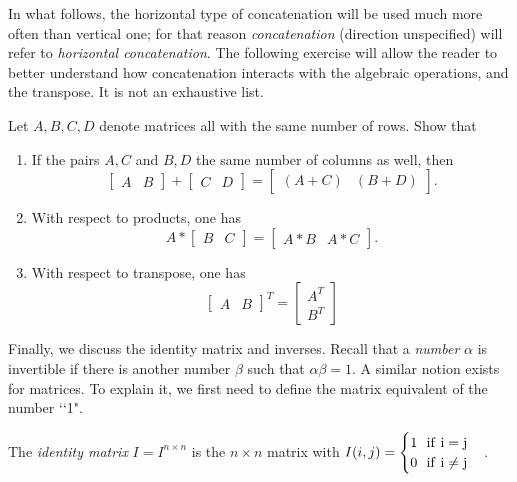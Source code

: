 \documentclass{ximera}
\begin{document}
In what follows, the horizontal type of concatenation will be used much more often than vertical one; for that reason {\it concatenation} (direction unspecified) will refer to {\it horizontal concatenation}. The following exercise will allow the reader to better understand how concatenation interacts with the algebraic operations, and the transpose. It is not an exhaustive list.

\begin{exercise} Let $A, B, C, D$ denote matrices all with the same number of rows. Show that
\begin{enumerate}
\item If the pairs $A,C$ and $B,D$ the same number of columns as well, then
\[
\begin{bmatrix} A & B\end{bmatrix} + \begin{bmatrix} C & D\end{bmatrix} = \begin{bmatrix} (A+C) & (B+D)\end{bmatrix}.
\]
\item With respect to products, one has
\[
A*\begin{bmatrix} B & C\end{bmatrix} = \begin{bmatrix} A*B & A*C\end{bmatrix}.
\]
\item With respect to transpose, one has
\[
\begin{bmatrix} A & B\end{bmatrix}^T = \begin{bmatrix} A^T \\ B^T\end{bmatrix}
\]
\end{enumerate}
\end{exercise}

Finally, we discuss the identity matrix and inverses. Recall that a {\it number} $\alpha$ is invertible if there is another number $\beta$ such that $\alpha\beta = 1$. A similar notion exists for matrices. To explain it, we first need to define the matrix equivalent of the number \lq\lq 1".

\begin{definition} The {\it identity matrix} $I = I^{n\times n}$ is the $n\times n$ matrix with $I(i,j) = \begin{cases}1\ \ \rm{if}\ i=j\\0\ \ \rm{if}\ i\ne j\end{cases}$.
\end{definition}
\end{document}
